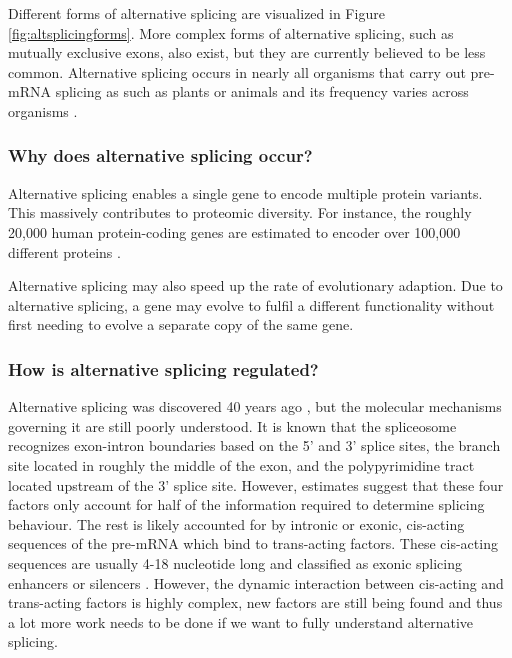 Different forms of alternative splicing are visualized in Figure \ref{fig:altsplicingforms}. More complex forms of alternative splicing, such as mutually exclusive exons, also exist, but they are currently believed to be less common. Alternative splicing occurs in nearly all organisms that carry out pre-mRNA splicing as such as plants or animals and its frequency varies across organisms \cite{splicing_current_perspectives}. 
\subsubsection{Why does alternative splicing occur?}
Alternative splicing enables a single gene to encode multiple protein variants. This massively contributes to proteomic diversity. For instance, the roughly 20,000 human protein-coding genes are estimated to encoder over 100,000 different proteins \cite{splicing_current_perspectives}.

Alternative splicing may also speed up the rate of evolutionary adaption. Due to alternative splicing, a gene may evolve to fulfil a different functionality without first needing to evolve a separate copy of the same gene. \cite{bretschneiderphdthesis}
\subsubsection{How is alternative splicing regulated?}
Alternative splicing was discovered 40 years ago \cite{discoveryofsplicing}, but the molecular mechanisms governing it are still poorly understood. It is known that the spliceosome recognizes exon-intron boundaries based on the 5' and 3' splice sites, the branch site located in roughly the middle of the exon, and the polypyrimidine tract located upstream of the 3' splice site. However, estimates suggest that these four factors only account for half of the information required to determine splicing behaviour. The rest is likely accounted for by intronic or exonic, cis-acting sequences of the pre-mRNA which bind to trans-acting factors. These cis-acting sequences are usually 4-18 nucleotide long and classified as exonic splicing enhancers or silencers \cite{splicing_current_perspectives}.
However, the dynamic interaction between cis-acting and trans-acting factors is highly complex, new factors are still being found and thus a lot more work needs to be done if we want to fully understand alternative splicing.

